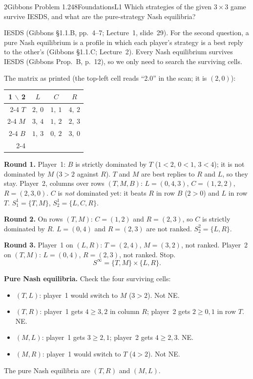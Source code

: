 \begin{exsol}{2}{Gibbons Problem 1.2}{48}{Foundations}{L1}
\asked Which strategies of the given $3 \times 3$ game survive IESDS, and what are the
pure-strategy Nash equilibria?

\method IESDS (Gibbons \S1.1.B, pp.~4--7; Lecture~1, slide~29). For the second question, a pure
Nash equilibrium is a profile in which each player's strategy is a best reply to the other's
(Gibbons \S1.1.C; Lecture~2). Every Nash equilibrium survives IESDS (Gibbons Prop.~B, p.~12), so
we only need to search the surviving cells.

\solution
The matrix as printed (the top-left cell reads ``2.0'' in the scan; it is $(2,0)$):
\begin{center}
\begin{tabular}{r|c|c|c|}
\multicolumn{1}{r}{1 $\backslash$ 2} & \multicolumn{1}{c}{$L$} & \multicolumn{1}{c}{$C$} & \multicolumn{1}{c}{$R$}\\ \cline{2-4}
$T$ & $2,\ 0$ & $1,\ 1$ & $4,\ 2$ \\ \cline{2-4}
$M$ & $3,\ 4$ & $1,\ 2$ & $2,\ 3$ \\ \cline{2-4}
$B$ & $1,\ 3$ & $0,\ 2$ & $3,\ 0$ \\ \cline{2-4}
\end{tabular}
\end{center}

\textbf{Round 1.} Player~1: $B$ is strictly dominated by $T$ ($1 < 2$, $0 < 1$, $3 < 4$); it is
not dominated by $M$ ($3 > 2$ against $R$). $T$ and $M$ are best replies to $R$ and $L$, so they
stay. Player~2, columns over rows $(T, M, B)$: $L = (0, 4, 3)$, $C = (1, 2, 2)$, $R = (2, 3, 0)$.
$C$ is \emph{not} dominated yet: it beats $R$ in row $B$ ($2 > 0$) and $L$ in row $T$.
$S_1^1 = \{T, M\}$, $S_2^1 = \{L, C, R\}$.

\textbf{Round 2.} On rows $(T, M)$: $C = (1, 2)$ and $R = (2, 3)$, so $C$ is strictly dominated by
$R$. $L = (0, 4)$ and $R = (2, 3)$ are not ranked. $S_2^2 = \{L, R\}$.

\textbf{Round 3.} Player~1 on $(L, R)$: $T = (2, 4)$, $M = (3, 2)$, not ranked. Player~2 on
$(T, M)$: $L = (0, 4)$, $R = (2, 3)$, not ranked. Stop.
\[
  S^\infty = \{T, M\} \times \{L, R\}.
\]

\textbf{Pure Nash equilibria.} Check the four surviving cells:
\begin{itemize}
  \item $(T, L)$: player~1 would switch to $M$ ($3 > 2$). Not NE.
  \item $(T, R)$: player~1 gets $4 \ge 3, 2$ in column $R$; player~2 gets $2 \ge 0, 1$ in row $T$. NE.
  \item $(M, L)$: player~1 gets $3 \ge 2, 1$; player~2 gets $4 \ge 2, 3$. NE.
  \item $(M, R)$: player~1 would switch to $T$ ($4 > 2$). Not NE.
\end{itemize}
The pure Nash equilibria are $(T, R)$ and $(M, L)$.


\end{exsol}
